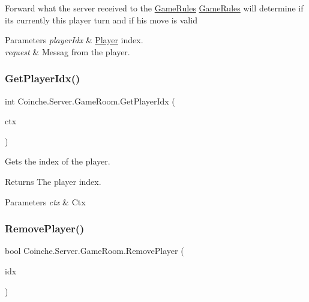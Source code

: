 Forward what the server received to the \hyperlink{class_coinche_1_1_game_rules}{Game\+Rules} \hyperlink{class_coinche_1_1_game_rules}{Game\+Rules} will determine if it\textquotesingle{}s currently this player turn and if his move is valid 


\begin{DoxyParams}{Parameters}
{\em player\+Idx} & \hyperlink{class_coinche_1_1_player}{Player} index.\\
\hline
{\em request} & Messag from the player.\\
\hline
\end{DoxyParams}
\mbox{\label{class_coinche_1_1_server_1_1_game_room_a5294b7dc12a6040fb394be108f401b99}} 
\subsubsection{\texorpdfstring{Get\+Player\+Idx()}{GetPlayerIdx()}}
{\footnotesize\ttfamily int Coinche.\+Server.\+Game\+Room.\+Get\+Player\+Idx (\begin{DoxyParamCaption}\item[{I\+Channel\+Handler\+Context}]{ctx }\end{DoxyParamCaption})\hspace{0.3cm}{\ttfamily [inline]}}



Gets the index of the player. 

\begin{DoxyReturn}{Returns}
The player index.
\end{DoxyReturn}

\begin{DoxyParams}{Parameters}
{\em ctx} & Ctx\\
\hline
\end{DoxyParams}
\mbox{\label{class_coinche_1_1_server_1_1_game_room_a91a044c5b36ad5114bd836a147a1d343}} 
\subsubsection{\texorpdfstring{Remove\+Player()}{RemovePlayer()}}
{\footnotesize\ttfamily bool Coinche.\+Server.\+Game\+Room.\+Remove\+Player (\begin{DoxyParamCaption}\item[{int}]{idx }\end{DoxyParamCaption})\hspace{0.3cm}{\ttfamily [inline]}}




